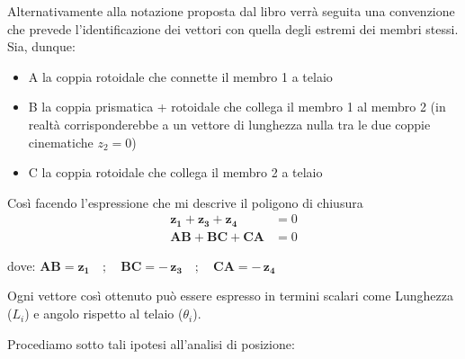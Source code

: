 				Alternativamente alla notazione proposta dal libro verrà seguita una convenzione che prevede l'identificazione dei vettori con quella degli estremi dei membri stessi.
				Sia, dunque:
				\begin{itemize}
					\item A la coppia rotoidale che connette il membro 1 a telaio
					\item B la coppia prismatica + rotoidale che collega il membro 1 al membro 2 (in realtà corrisponderebbe a un vettore di lunghezza nulla tra le due coppie cinematiche $z_2 = 0$)
					\item C la coppia rotoidale che collega il membro 2 a telaio
				\end{itemize}
			
			Così facendo l'espressione che mi descrive il poligono di chiusura 
			\begin{align*}
				\mathbf{z_1} + \mathbf{z_3} + \mathbf{z_4} &= 0\\
				\mathbf{AB} + \mathbf{BC} + \mathbf{CA} &= 0
			\end{align*}
	
			dove: \hspace{4cm}$\mathbf{AB} = \mathbf{z_1}\quad;\quad\mathbf{BC} = -\,\mathbf{z_3} \quad;\quad\mathbf{CA} = -\,\mathbf{z_4}$\newline
			
			Ogni vettore così ottenuto può essere espresso in termini scalari come Lunghezza ($L_i$) e angolo rispetto al telaio ($\theta_i$).
			
			Procediamo sotto tali ipotesi all'analisi di posizione:
			
